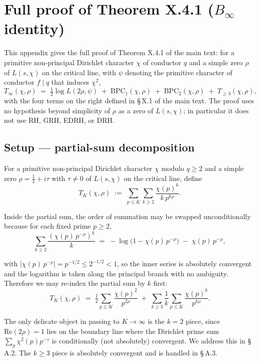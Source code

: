 \section{Full proof of Theorem X.4.1 ($B_\infty$ identity)}

This appendix gives the full proof of Theorem X.4.1 of the main text:
for a primitive non-principal Dirichlet character \(\chi\) of conductor
\(q\) and a simple zero \(\rho\) of \(L(s,\chi)\) on the critical line, with
\(\psi\) denoting the primitive character of conductor \(f \mid q\) that
induces \(\chi^2\),
\begin{equation}
\label{eq:Binfty-appendix}
T_\infty(\chi,\rho)
\;=\;
\tfrac12 \log L(2\rho, \psi)
\;+\; \mathrm{BPC}_1(\chi,\rho)
\;+\; \mathrm{BPC}_2(\chi,\rho)
\;+\; T_{\ge 3}(\chi,\rho),
\tag{$\star$}
\end{equation}
with the four terms on the right defined in \S\,X.1 of the main text.
The proof uses no hypothesis beyond simplicity of \(\rho\) as a zero of
\(L(s,\chi)\); in particular it does not use RH, GRH, EDRH, or DRH.

\subsection{Setup --- partial-sum decomposition}

For a primitive non-principal Dirichlet character \(\chi\) modulo
\(q \ge 2\) and a simple zero \(\rho = \tfrac12 + i\tau\) with \(\tau \ne 0\)
of \(L(s, \chi)\) on the critical line, define
\[
T_K(\chi,\rho) \;:=\; \sum_{p \le K} \sum_{k \ge 2}
\frac{\chi(p)^k}{k\, p^{k\rho}}.
\]

Inside the partial sum, the order of summation may be swapped
unconditionally because for each fixed prime \(p \ge 2\),
\[
\sum_{k \ge 2} \frac{(\chi(p)\, p^{-\rho})^k}{k}
\;=\; -\log\bigl(1 - \chi(p)\,p^{-\rho}\bigr) \;-\; \chi(p)\,p^{-\rho},
\]

with \(\bigl|\chi(p)\,p^{-\rho}\bigr| = p^{-1/2} \le 2^{-1/2} < 1\), so
the inner series is absolutely convergent and the logarithm is taken
along the principal branch with no ambiguity. Therefore we may
re-index the partial sum by \(k\) first:
\begin{equation}
\label{eq:T_K-split}
T_K(\chi,\rho)
\;=\;
\tfrac{1}{2} \sum_{p \le K} \frac{\chi(p)^2}{p^{2\rho}}
\;+\;
\sum_{k \ge 3} \frac{1}{k} \sum_{p \le K} \frac{\chi(p)^k}{p^{k\rho}}.
\end{equation}

The only delicate object in passing to \(K \to \infty\) is the \(k=2\)
piece, since \(\mathrm{Re}(2\rho) = 1\) lies on the boundary line where
the Dirichlet prime sum \(\sum_p \chi^2(p) p^{-s}\) is conditionally
(not absolutely) convergent. We address this in \S\,A.2. The \(k \ge 3\)
piece is absolutely convergent and is handled in \S\,A.3.

